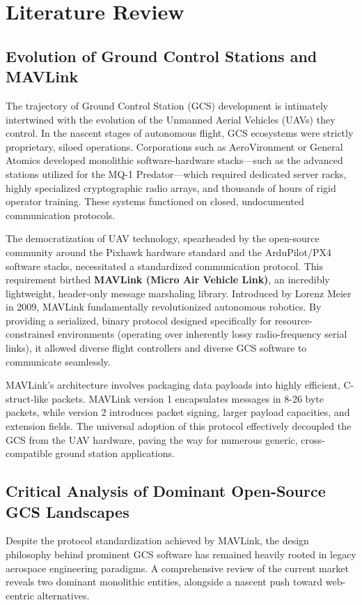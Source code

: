 \chapter{Literature Review}

\section{Evolution of Ground Control Stations and MAVLink}
The trajectory of Ground Control Station (GCS) development is intimately intertwined with the evolution of the Unmanned Aerial Vehicles (UAVs) they control. In the nascent stages of autonomous flight, GCS ecosystems were strictly proprietary, siloed operations. Corporations such as AeroVironment or General Atomics developed monolithic software-hardware stacks—such as the advanced stations utilized for the MQ-1 Predator—which required dedicated server racks, highly specialized cryptographic radio arrays, and thousands of hours of rigid operator training. These systems functioned on closed, undocumented communication protocols.

The democratization of UAV technology, spearheaded by the open-source community around the Pixhawk hardware standard and the ArduPilot/PX4 software stacks, necessitated a standardized communication protocol. This requirement birthed \textbf{MAVLink (Micro Air Vehicle Link)}, an incredibly lightweight, header-only message marshaling library. Introduced by Lorenz Meier in 2009, MAVLink fundamentally revolutionized autonomous robotics. By providing a serialized, binary protocol designed specifically for resource-constrained environments (operating over inherently lossy radio-frequency serial links), it allowed diverse flight controllers and diverse GCS software to communicate seamlessly.

MAVLink's architecture involves packaging data payloads into highly efficient, C-struct-like packets. MAVLink version 1 encapsulates messages in 8-26 byte packets, while version 2 introduces packet signing, larger payload capacities, and extension fields. The universal adoption of this protocol effectively decoupled the GCS from the UAV hardware, paving the way for numerous generic, cross-compatible ground station applications.

\section{Critical Analysis of Dominant Open-Source GCS Landscapes}
Despite the protocol standardization achieved by MAVLink, the design philosophy behind prominent GCS software has remained heavily rooted in legacy aerospace engineering paradigms. A comprehensive review of the current market reveals two dominant monolithic entities, alongside a nascent push toward web-centric alternatives.

